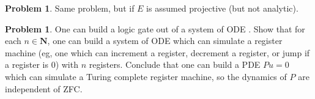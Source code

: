 \documentclass[reqno,11pt]{amsart}
\newcommand{\NN}{\mathbf{N}}
\theoremstyle{definition}
\newtheorem{problem}[theorem]{Problem}
\numberwithin{equation}{section}
\begin{document}
\begin{problem}
Same problem, but if $E$ is assumed projective (but not analytic).
\end{problem}

\begin{problem}
One can build a logic gate out of a system of ODE \cite{Tao16}.
Show that for each $n \in \NN$, one can build a system of ODE which can simulate a register machine (eg, one which can increment a register, decrement a register, or jump if a register is $0$) with $n$ registers.
Conclude that one can build a PDE $Pu = 0$ which can simulate a Turing complete register machine, so the dynamics of $P$ are independent of ZFC.
\end{problem}



\printbibliography
\end{document}

